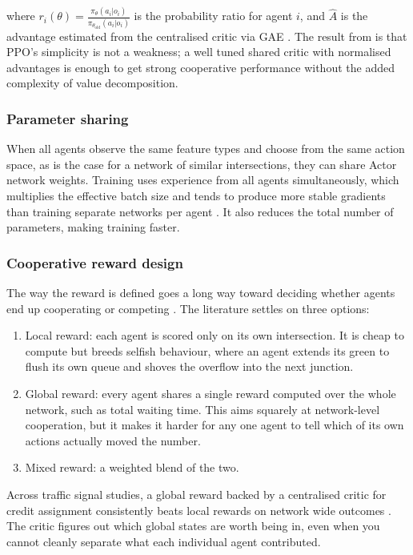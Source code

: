 ﻿\documentclass[11pt, a4paper]{report}
\begin{document}
where $r_i(\theta) = \frac{\pi_\theta(a_i | o_i)}{\pi_{\theta_\text{old}}(a_i | o_i)}$ is the probability ratio for agent $i$, and $\hat{A}$ is the advantage estimated from the centralised critic via GAE \cite{schulman2015high}. The result from \cite{yu2022surprising} is that PPO's simplicity is not a weakness; a well tuned shared critic with normalised advantages is enough to get strong cooperative performance without the added complexity of value decomposition.

\subsubsection{Parameter sharing}

When all agents observe the same feature types and choose from the same action space, as is the case for a network of similar intersections, they can share Actor network weights. Training uses experience from all agents simultaneously, which multiplies the effective batch size and tends to produce more stable gradients than training separate networks per agent \cite{gupta2017cooperative}. It also reduces the total number of parameters, making training faster.

\subsubsection{Cooperative reward design}
The way the reward is defined goes a long way toward deciding whether agents end up cooperating or competing \cite{chu2019multi}. The literature settles on three options:

\begin{enumerate}
    \item Local reward: each agent is scored only on its own intersection. It is cheap to compute but breeds selfish behaviour, where an agent extends its green to flush its own queue and shoves the overflow into the next junction.
    \item Global reward: every agent shares a single reward computed over the whole network, such as total waiting time. This aims squarely at network-level cooperation, but it makes it harder for any one agent to tell which of its own actions actually moved the number.
    \item Mixed reward: a weighted blend of the two.
\end{enumerate}

Across traffic signal studies, a global reward backed by a centralised critic for credit assignment consistently beats local rewards on network wide outcomes \cite{chu2019multi, wei2019colight}. The critic figures out which global states are worth being in, even when you cannot cleanly separate what each individual agent contributed.
\end{document}
